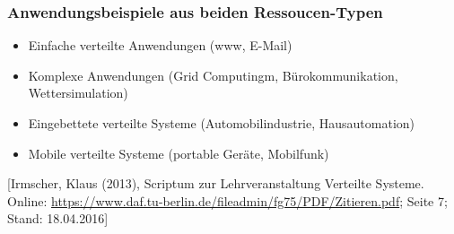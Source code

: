 \documentclass[a4paper]{scrartcl}
\begin{document}
	\subsubsection{Anwendungsbeispiele aus beiden Ressoucen-Typen}
		\begin{itemize}
			\item Einfache verteilte Anwendungen (www, E-Mail)
			\item Komplexe Anwendungen (Grid Computingm, Bürokommunikation, Wettersimulation)
			\item Eingebettete verteilte Systeme (Automobilindustrie, Hausautomation)
			\item Mobile verteilte Systeme (portable Geräte, Mobilfunk)
		\end{itemize}
		[Irmscher, Klaus (2013), Scriptum zur Lehrveranstaltung Verteilte Systeme. Online: \url{https://www.daf.tu-berlin.de/fileadmin/fg75/PDF/Zitieren.pdf}; Seite 7; Stand: 18.04.2016]
\end{document}
